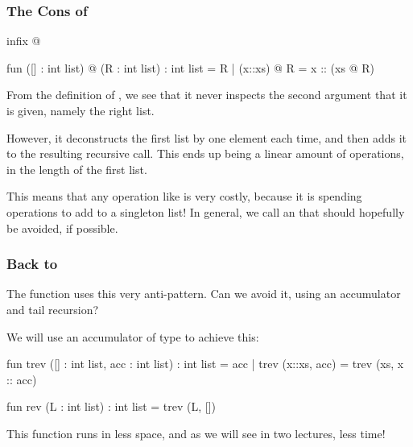\documentclass[aspectratio=169]{beamer}
\begin{document}
\begin{frame}[fragile]
  \frametitle{The Cons of }

  \begin{codeblock}
    infix @

    fun ([] : int list) @ (R : int list) : int list = R
      | (x::xs) @ R = x :: (xs @ R)
  \end{codeblock}

  \pause
  From the definition of , we see that it never inspects the second argument that it
  is given, namely the right list.

  \pause
  \vspace{\fill}

  However, it deconstructs the first list by one element each time, and then adds it to the
  resulting recursive call. This ends up being a linear amount of operations, in the length
  of the first list.

  \pause
  \vspace{\fill}

  This means that any operation like  is very costly, because it is spending
   operations to add to a singleton list! In general, we call  an
   that should hopefully be avoided, if possible.
\end{frame}

\begin{frame}[fragile]
  \frametitle{Back to }

  The  function uses this very anti-pattern. Can we avoid it, using an accumulator
  and tail recursion?

  \pause
  \vspace{\fill}

  We will use an accumulator of type  to achieve this:

  \pause
  \begin{codeblock}
    fun trev ([] : int list, acc : int list) : int list = acc
      | trev (x::xs, acc) = trev (xs, x :: acc)

    fun rev (L : int list) : int list = trev (L, [])
  \end{codeblock}

  \pause
  \vspace{\fill}

  This  function runs in less space, and as we will see in two lectures,
  less time!
\end{frame}
\end{document}
